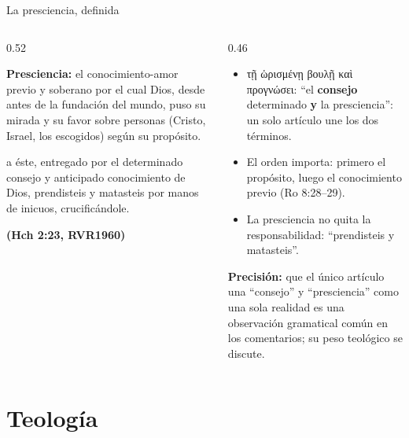 \documentclass[hyperref={bookmarks=false},aspectratio=169]{beamer}
\newcommand{\grc}[1]{\foreignlanguage{ancientgreek}{#1}}
\newcommand{\fuente}[1]{\par\hfill{\upshape\bfseries\footnotesize\textcolor{azul}{#1}}}
\newcommand{\destacar}[1]{\textbf{\textcolor{azul}{#1}}}
\newcommand{\precision}[1]{{\footnotesize\color{gris}\textbf{Precisión:} #1}}
\begin{document}
\begin{frame}{La presciencia, definida}
\begin{columns}[t,onlytextwidth]
\begin{column}{0.52\textwidth}
\begin{tcolorbox}[colback=papiro,colframe=dorado,boxrule=1.2pt,arc=3pt]
\small\textbf{Presciencia:} el conocimiento-amor previo y soberano por el cual Dios, desde antes de la fundación del mundo, puso su mirada y su favor sobre personas (Cristo, Israel, los escogidos) según su propósito.
\end{tcolorbox}
\begin{cita}a éste, entregado por el determinado consejo y anticipado conocimiento de Dios, prendisteis y matasteis por manos de inicuos, crucificándole.\fuente{(Hch 2:23, RVR1960)}\end{cita}
\end{column}
\begin{column}{0.46\textwidth}\small
\begin{itemize}
\item \grc{τῇ ὡρισμένῃ βουλῇ καὶ προγνώσει}: ``el \destacar{consejo} determinado \destacar{y} la presciencia'': un solo artículo une los dos términos.
\item El orden importa: primero el propósito, luego el conocimiento previo (Ro 8:28--29).
\item La presciencia no quita la responsabilidad: ``prendisteis y matasteis''.
\end{itemize}
\precision{que el único artículo una ``consejo'' y ``presciencia'' como una sola realidad es una observación gramatical común en los comentarios; su peso teológico se discute.}
\end{column}
\end{columns}
\end{frame}

\section{Teología}
\end{document}
